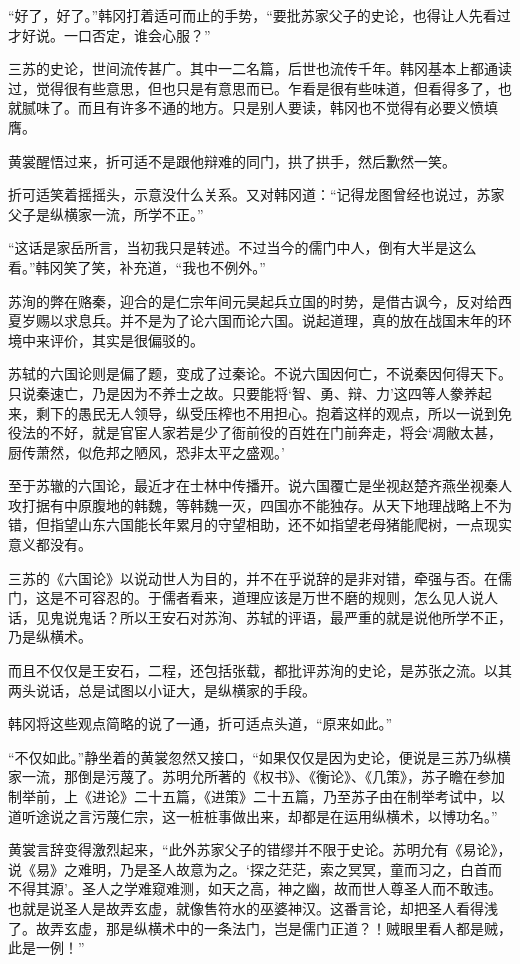 “好了，好了。”韩冈打着适可而止的手势，“要批苏家父子的史论，也得让人先看过才好说。一口否定，谁会心服？”

三苏的史论，世间流传甚广。其中一二名篇，后世也流传千年。韩冈基本上都通读过，觉得很有些意思，但也只是有意思而已。乍看是很有些味道，但看得多了，也就腻味了。而且有许多不通的地方。只是别人要读，韩冈也不觉得有必要义愤填膺。

黄裳醒悟过来，折可适不是跟他辩难的同门，拱了拱手，然后歉然一笑。

折可适笑着摇摇头，示意没什么关系。又对韩冈道：“记得龙图曾经也说过，苏家父子是纵横家一流，所学不正。”

“这话是家岳所言，当初我只是转述。不过当今的儒门中人，倒有大半是这么看。”韩冈笑了笑，补充道，“我也不例外。”

苏洵的弊在赂秦，迎合的是仁宗年间元昊起兵立国的时势，是借古讽今，反对给西夏岁赐以求息兵。并不是为了论六国而论六国。说起道理，真的放在战国末年的环境中来评价，其实是很偏驳的。

苏轼的六国论则是偏了题，变成了过秦论。不说六国因何亡，不说秦因何得天下。只说秦速亡，乃是因为不养士之故。只要能将‘智、勇、辩、力’这四等人豢养起来，剩下的愚民无人领导，纵受压榨也不用担心。抱着这样的观点，所以一说到免役法的不好，就是官宦人家若是少了衙前役的百姓在门前奔走，将会‘凋敝太甚，厨传萧然，似危邦之陋风，恐非太平之盛观。’

至于苏辙的六国论，最近才在士林中传播开。说六国覆亡是坐视赵楚齐燕坐视秦人攻打据有中原腹地的韩魏，等韩魏一灭，四国亦不能独存。从天下地理战略上不为错，但指望山东六国能长年累月的守望相助，还不如指望老母猪能爬树，一点现实意义都没有。

三苏的《六国论》以说动世人为目的，并不在乎说辞的是非对错，牵强与否。在儒门，这是不可容忍的。于儒者看来，道理应该是万世不磨的规则，怎么见人说人话，见鬼说鬼话？所以王安石对苏洵、苏轼的评语，最严重的就是说他所学不正，乃是纵横术。

而且不仅仅是王安石，二程，还包括张载，都批评苏洵的史论，是苏张之流。以其两头说话，总是试图以小证大，是纵横家的手段。

韩冈将这些观点简略的说了一通，折可适点头道，“原来如此。”

“不仅如此。”静坐着的黄裳忽然又接口，“如果仅仅是因为史论，便说是三苏乃纵横家一流，那倒是污蔑了。苏明允所著的《权书》、《衡论》、《几策》，苏子瞻在参加制举前，上《进论》二十五篇，《进策》二十五篇，乃至苏子由在制举考试中，以道听途说之言污蔑仁宗，这一桩桩事做出来，却都是在运用纵横术，以博功名。”

黄裳言辞变得激烈起来，“此外苏家父子的错缪并不限于史论。苏明允有《易论》，说《易》之难明，乃是圣人故意为之。‘探之茫茫，索之冥冥，童而习之，白首而不得其源’。圣人之学难窥难测，如天之高，神之幽，故而世人尊圣人而不敢违。也就是说圣人是故弄玄虚，就像售符水的巫婆神汉。这番言论，却把圣人看得浅了。故弄玄虚，那是纵横术中的一条法门，岂是儒门正道？！贼眼里看人都是贼，此是一例！”

